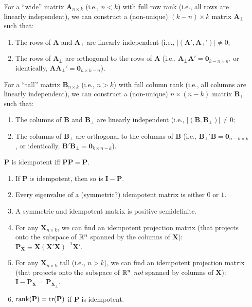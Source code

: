\documentclass[8pt,letterpaper, landscape]{extarticle} %
\newcommand{\mA}{\ensuremath{\mathbf{A}}}
\newcommand{\mB}{\ensuremath{\mathbf{B}}}
\newcommand{\mX}{\ensuremath{\mathbf{X}}}
\newcommand{\mI}{\ensuremath{\mathbf{I}}}
\newcommand{\mzero}{\ensuremath{\mathbf{0}}}
\begin{document}
\begin{multicols}{3}
\begin{description}
 For a ``wide'' matrix $ \mA_{n \times k} $ (i.e., $ n < k $) with full row rank (i.e., all rows are linearly independent), we can construct a (non-unique) $ (k - n) \times k $ matrix $ \mA_\perp $ such that:
\begin{enumerate}
\item The rows of $ \mA $ and $ \mA_\perp $ are linearly independent (i.e., $ | (\mA', \mA_{\perp}' ) | \neq 0 $;
\item The rows of $ \mA_\perp $ are orthogonal to the rows of $ \mA $ (i.e., $ \mA_\perp \mA' = \mzero_{k-n \times n} $, or identically, $ \mA \mA_{\perp}' = \mzero_{n \times k-n} $).
\end{enumerate}
For a ``tall'' matrix $ \mB_{n \times k} $ (i.e., $ n > k $) with full column rank (i.e., all columns are linearly independent), we can construct a (non-unique) $ n \times (n - k) $ matrix $ \mB_\perp $ such that:
\begin{enumerate}
\item The columns of $ \mB $ and $ \mB_\perp $ are linearly independent (i.e., $ | (\mB, \mB_{\perp} ) | \neq 0 $;
\item The columns of $ \mB_\perp $ are orthogonal to the columns of $ \mB $ (i.e., $ \mB_{\perp}' \mB = \mzero_{n-k \times k} $, or identically, $ \mB' \mB_{\perp} = \mzero_{k \times n-k} $).
\end{enumerate}

 $ \mathbf{P} $ is idempotent iff $ \mathbf{P} \mathbf{P} = \mathbf{P} $.
\begin{enumerate}
\item If $ \mathbf{P} $ is idempotent, then so is $ \mI - \mathbf{P} $.
\item Every eigenvalue of a (symmetric?) idempotent matrix is either $ 0 $ or $ 1 $.
\item A symmetric and idempotent matrix is positive semidefinite.
\item For any $ \mX_{n \times k} $, we can find an idempotent projection matrix (that projects onto the subspace of $ \mathbb{R}^n $ spanned by the columns of $ \mX $): $ \mathbf{P}_{\mX} \equiv \mX (\mX' \mX)^{-1} \mX' $.
\item For any $ \mX_{n \times k} $ tall (i.e., $ n > k $), we can find an idempotent projection matrix (that projects onto the subspace of $ \mathbb{R}^n $ \textit{not} spanned by columns of $ \mX $): $ \mI - \mathbf{P}_{\mX} = \mathbf{P}_{\mX_\perp} $.
\item $ \operatorname{rank} (\mathbf{P}) = \operatorname{tr}(\mathbf{P}) $ if $ \mathbf{P} $ is idempotent.
\end{enumerate}


\end{description}
\end{multicols}
\end{document}
